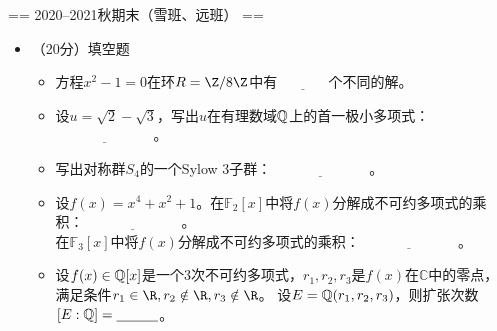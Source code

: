 == 2020--2021秋期末（雪班、远班） ==
\begin{itemize}
\item[（一）]（20分）填空题
\begin{itemize}
\item[1.] 方程$x^2-1=0$在环$R=\Z/8\Z$中有 $\underline{\qquad\quad}$ 个不同的解。
\item[2.] 设$u=\sqrt{2}-\sqrt{3}$，写出$u$在有理数域$\mathbb{Q}$上的首一极小多项式：$\underline{\qquad\qquad\qquad\quad}$。
\item[3.] 写出对称群$S_4$的一个Sylow $3$子群：$\underline{\qquad\qquad\qquad\quad}$。
\item[4.] 设$f(x)=x^4+x^2+1$。在$\mathbb{F}_2[x]$中将$f(x)$分解成不可约多项式的乘积：$\underline{\qquad\qquad\qquad\quad}$。\\
          在$\mathbb{F}_3[x]$中将$f(x)$分解成不可约多项式的乘积：$\underline{\qquad\qquad\qquad\quad}$。
\item[5.] 设$f(x)\in\mathbb{Q}[x]$是一个$3$次不可约多项式，$r_1,r_2,r_3$是$f(x)$在$\mathbb{C}$中的零点，
          满足条件$r_1\in \R,r_2\notin \R,r_3\notin \R$。
          设$E=\mathbb{Q}(r_1,r_2,r_3)$，则扩张次数$[E:\mathbb{Q}]=\underline{\qquad\quad}$。
\end{itemize}


\end{itemize}
